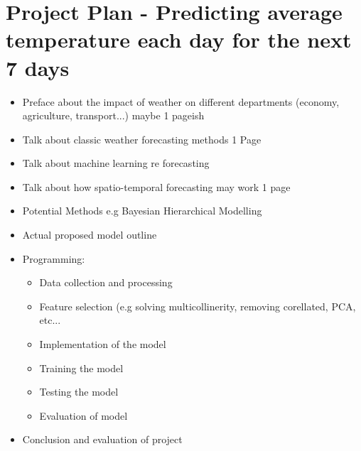\section{Project Plan -  Predicting average temperature each day for the next 7 days}

    \begin{itemize}

    \item Preface about the impact of weather on different departments (economy, agriculture, transport...) maybe 1 pageish
    
    
    \item Talk about classic weather forecasting methods 1 Page
    
    \item Talk about machine learning re forecasting 
    
    \item Talk about how spatio-temporal forecasting may work 1 page
    
    \item Potential Methods e.g Bayesian Hierarchical Modelling
    
    \item Actual proposed model outline
    
    
    \item  Programming:
    \begin{itemize}
        \item Data collection and processing
        
        \item Feature selection (e.g solving multicollinerity, removing corellated, PCA, etc...
        
        
        \item Implementation of the model
        
        \item Training the model
        
        \item Testing the model
        
        \item Evaluation of model
    \end{itemize}
    

    \item Conclusion and evaluation of project
    
    
    \end{itemize}
